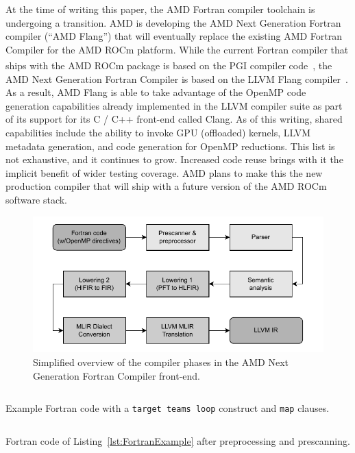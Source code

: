 \documentclass[acmtog,natbib=false]{acmart}
\newcommand{\code}[1]{\texttt{#1}\xspace}
\newcommand{\registered}[0]{\textsuperscript{\textregistered}\xspace}
\newcommand{\trademark}[0]{\texttrademark\xspace}
\begin{document}
At the time of writing this paper, the AMD Fortran compiler toolchain is undergoing a transition.
AMD is developing the AMD Next Generation Fortran compiler (``AMD Flang'') that will eventually replace the existing AMD Fortran Compiler for the AMD ROCm\trademark platform.
While the current Fortran compiler that ships with the AMD ROCm\trademark package is based on the PGI\registered compiler code~\cite{Lara17,Pric17}, the AMD Next Generation Fortran Compiler is based on the LLVM Flang compiler~\cite{LLVM25}.
As a result, AMD Flang is able to take advantage of the OpenMP code generation capabilities already implemented in the LLVM compiler suite as part of its support for its C / C++ front-end called Clang.
As of this writing, shared capabilities include the ability to invoke GPU (offloaded) kernels, LLVM metadata generation, and code generation for OpenMP reductions.
This list is not exhaustive, and it continues to grow. Increased code reuse brings with it the implicit benefit of wider testing coverage.
AMD plans to make this the new production compiler that will ship with a future version of the AMD ROCm\trademark software stack.

\begin{figure}[t]
\centering
\includegraphics[width=\linewidth]{figures/flang_compiler_phases_overview.pdf}
\caption{Simplified overview of the compiler phases in the AMD Next Generation Fortran Compiler front-end.\label{fig:FlangCompilerPhases}}
\end{figure}

\begin{listing}[t]
\inputminted{Fortran}{code/tgt_loop.f90}
\caption{Example Fortran code with a \code{target teams loop} construct and \code{map} clauses.}
\label{lst:FortranExample}
\end{listing}

\begin{listing}[t]
\inputminted{text}{code/tgt_loop_cooked.f90}
\caption{Fortran code of Listing~\ref{lst:FortranExample} after preprocessing and prescanning.}
\label{lst:FortranExampleCooked}
\end{listing}
\end{document}
